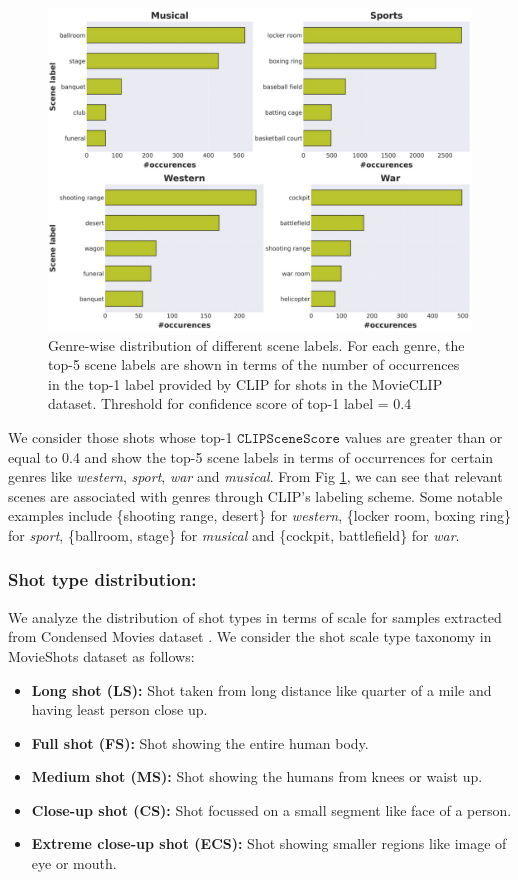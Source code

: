 \begin{figure}[h!]
    \centering
    \includegraphics[width=0.8\columnwidth]{figures/genre_wise_distribution_plots_clip_label.png}
    \caption{Genre-wise distribution of different scene labels. For each genre, the top-5 scene labels are shown in terms of the number of occurrences in the top-1 label provided by CLIP \cite{CLIP} for shots in the MovieCLIP dataset. Threshold for confidence score of top-1 label = 0.4}
    \label{genre distribution}
\end{figure}
We consider those shots whose top-1 $\texttt{CLIPSceneScore}$ values are greater than or equal to 0.4 and show the top-5 scene labels in terms of occurrences for certain genres like \textit{western}, \textit{sport}, \textit{war} and \textit{musical}.  From Fig \ref{genre distribution}, we can see that relevant scenes are associated with genres through CLIP's labeling scheme. Some notable examples include \{shooting range, desert\} for \textit{western}, \{locker room, boxing ring\} for \textit{sport}, \{ballroom, stage\}  for \textit{musical} and \{cockpit, battlefield\} for \textit{war}.

\subsubsection{Shot type distribution:}
We analyze the distribution of shot types in terms of scale for samples extracted from Condensed Movies dataset \cite{bain2020condensed}. We consider the shot scale type taxonomy in MovieShots \cite{rao2020unified} dataset as follows:

\begin{itemize}
    \item \textbf{Long shot (LS):} Shot taken from long distance like quarter of a mile and having least person close up.
    \item \textbf{Full shot (FS):} Shot showing the entire human body.
    \item \textbf{Medium shot (MS):} Shot showing the humans from knees or waist up.
    \item \textbf{Close-up shot (CS):} Shot focussed on a small segment like face of a person.
    \item \textbf{Extreme close-up shot (ECS):} Shot showing smaller regions like image of eye or mouth.
\end{itemize}

